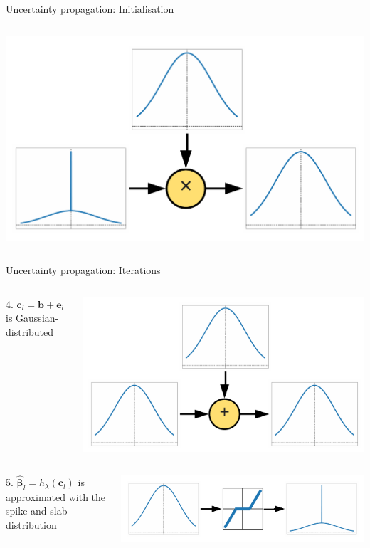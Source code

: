 \documentclass[9pt]{beamer}
\begin{document}
\begin{frame}{Uncertainty propagation: Initialisation}
\begin{columns}
    \begin{column}{0.67\textwidth}
        \includegraphics[width=0.6\columnwidth]{graphics/gauss_spsl.pdf}
      \end{column}
    \end{columns}
\end{frame}

\begin{frame}{Uncertainty propagation: Iterations}
    \begin{columns}
      \begin{column}{0.33\textwidth}
      4. \(\mathbf{c}_l = \mathbf{b} + \mathbf{e}_l\) is Gaussian-distributed
    \end{column}
    \begin{column}{0.67\textwidth}
        \includegraphics[width=0.6\columnwidth]{graphics/gauss_gauss.pdf}
      \end{column}
    \end{columns}
    \begin{columns}
      \begin{column}{0.33\textwidth}
      5. \(\widehat{\boldsymbol\beta}_{l} = h_\lambda(\mathbf{c}_l)\) is approximated with the spike and slab distribution
    \end{column}
    \begin{column}{0.67\textwidth}
        \includegraphics[width=0.6\columnwidth]{graphics/spsl_propagation.pdf}

\end{column}
\end{columns}
\end{frame}
\end{document}
